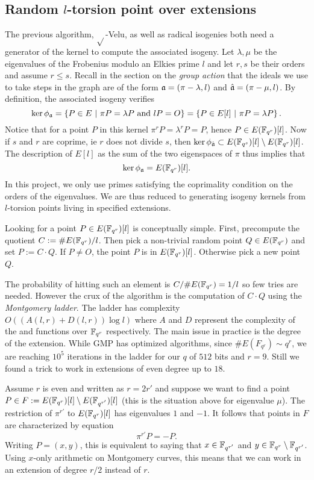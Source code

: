 \documentclass[../main.tex]{subfilesubs}
\begin{document}
\subsection{Random $l$-torsion point over extensions}
The previous algorithm, $\sqrt{}$-Velu, as well as radical isogenies both need a generator of the kernel to compute the associated isogeny.
Let $\lambda, \mu$ be the eigenvalues of the Frobenius modulo an Elkies prime $l$ and let $r, s$ be their orders and assume $r\leq s$.
Recall in the section on the \textit{group action} that the ideals we use to take steps in the graph are of the form $\mathfrak{a} = (\pi -\lambda, l)$ and $\hat{\mathfrak{a}} = (\pi -\mu, l)$.
By definition, the associated isogeny verifies
\[
        \ker\phi_{\mathfrak{a}} = \left\{P\in E\ |\ \pi P = \lambda P \text{ and } lP = O \right\} = \left\{P\in E[l]\ |\ \pi P = \lambda P  \right\}.
\]
Notice that for a point $P$ in this kernel $\pi^r P = \lambda^r P = P$, hence $P\in E(\mathbb{F}_{q^r})[l]$.
Now if $s$ and $r$ are coprime, ie $r$ does not divide $s$, then $\ker\phi_{\hat{\mathfrak{a}}} \subset  E(\mathbb{F}_{q^s})[l]\setminus E(\mathbb{F}_{q^r})[l]$.
The description of $E[l]$ as the sum of the two eigenspaces of $\pi$ thus implies that
\[
       \ker\phi_{\mathfrak{a}}  = E(\mathbb{F}_{q^r})[l].
\]
In this project, we only use primes satisfying the coprimality condition on the orders of the eigenvalues.
We are thus reduced to generating isogeny kernels from $l$-torsion points living in specified extensions.

Looking for a point $P\in E(\mathbb{F}_{q^r})[l]$ is conceptually simple.
First, precompute the quotient $C := \#E(\mathbb{F}_{q^r}) / l$.
Then pick a non-trivial random point $Q\in E(\mathbb{F}_{q^r})$ and set $P := C\cdot Q$.
If $P\neq O$, the point $P$ is in $E(\mathbb{F}_{q^r})[l]$.
Otherwise pick a new point $Q$.

The probability of hitting such an element is $C/\#E(\mathbb{F}_{q^r}) = 1/l$ so few tries are needed.
However the crux of the algorithm is the computation of $C\cdot Q$ using the \textit{Montgomery ladder}.
The ladder has complexity $O((A(l, r) + D(l, r))\log{l})$ where $A$ and $D$ represent the complexity of the  and  functions over $\mathbb{F}_{q^r}$ respectively.
The main issue in practice is the degree of the extension.
While GMP has optimized algorithms, since $\# E(F_{q^r}) \sim q^r$, we are reaching $10^5$ iterations in the ladder for our $q$ of $512$ bits and $r=9$.
Still we found a trick to work in extensions of even degree up to $18$.

Assume $r$ is even and written as $r = 2r'$ and suppose we want to find  a point $P\in F : = E(\mathbb{F}_{q^r})[l]\setminus E(\mathbb{F}_{q^{r'}})[l]$ (this is the situation above for eigenvalue $\mu$).
The restriction of $\pi^{r'}$ to $E(\mathbb{F}_{q^r})[l]$  has eigenvalues $1$ and $-1$.
It follows that points in $F$ are characterized by equation
\[
	\pi^{r'} P = -P.
\]
Writing $P=(x, y)$, this is equivalent to saying that $x\in \mathbb{F}_{q^{r'}}$ and $y\in \mathbb{F}_{q^{r}}\setminus\mathbb{F}_{q^{r'}}$.
Using $x$-only arithmetic on Montgomery curves, this means that we can work in an extension of degree $r/2$ instead of $r$.
\end{document}
